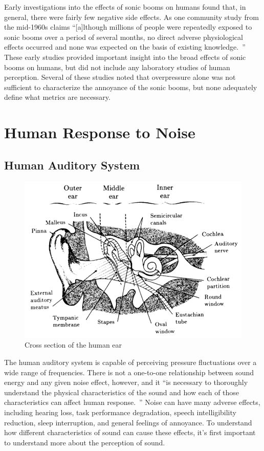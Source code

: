\documentclass[]{aiaa-tc}%
\begin{document}
Early investigations into the effects of sonic booms on humans found that, in general, there were fairly few negative side effects. As one community study from the mid-1960s claims ``[a]lthough millions of people were repeatedly exposed to sonic booms over a period of several months, no direct adverse physiological effects occurred and none was expected on the basis of existing knowledge.~\cite{nixon1966effects}'' These early studies provided important insight into the broad effects of sonic booms on humans, but did not include any laboratory studies of human perception. Several of these studies noted that overpressure alone was not sufficient to characterize the annoyance of the sonic booms, but none adequately define what metrics are necessary.

\section{Human Response to Noise}
\subsection{Human Auditory System}

\begin{figure}[tb!]
  \centering
  \includegraphics[width=\textwidth]{figs/ear-cross-section.png}
  \caption{Cross section of the human ear~\cite{powell1991human}}
  \label{fig:ear_cross}
\end{figure}

The human auditory system is capable of perceiving pressure fluctuations over a wide range of frequencies. There is not a one-to-one relationship between sound energy and any given noise effect, however, and it ``is necessary to thoroughly understand the physical characteristics of the sound and how each of those characteristics can affect human response.~\cite{powell1991human}'' Noise can have many adverse effects, including hearing loss, task performance degradation, speech intelligibility reduction, sleep interruption, and general feelings of annoyance. To understand how different characteristics of sound can cause these effects, it's first important to understand more about the perception of sound.
\end{document}
